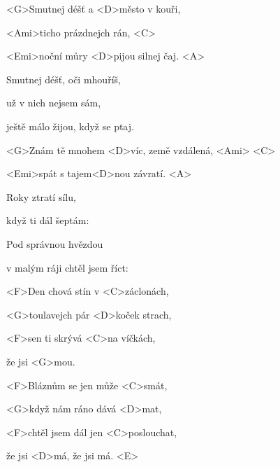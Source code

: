 

\zs
<G>Smutnej déšť a <D>město v kouři,

<Ami>ticho prázdnejch rán, <C>

<Emi>noční můry <D>pijou silnej čaj. <A>
\ks

\zs
Smutnej déšť, oči mhouříš,

už v nich nejsem sám,

ještě málo žijou, když se ptaj.
\ks

\zr
<G>Znám tě mnohem <D>víc, země vzdálená, <Ami> <C>

<Emi>spát s tajem<D>nou závratí. <A>
\kr

\zs
Roky ztratí sílu,

když ti dál šeptám:

\ks

\zs
Pod správnou hvězdou

v malým ráji chtěl jsem říct:

\ks

\zs
<F>Den chová stín v <C>záclonách,

<G>toulavejch pár <D>koček strach,

<F>sen ti skrývá <C>na víčkách,

že jsi <G>mou.
\ks

\zs
<F>Bláznům se jen může <C>smát,

<G>když nám ráno dává <D>mat,

<F>chtěl jsem dál jen <C>poslouchat,

že jsi <D>má, že jsi má. <E>
\ks

\zr
\kr

\kp
